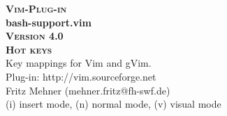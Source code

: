 \documentclass[oneside,11pt,landscape,DIV16]{scrartcl}
\newcommand{\Pluginversion}{4.0}
\begin{document}
%

\begin{multicols}{3}
%
\begin{center}
%
\textbf{\textsc{\small{Vim-Plug-in}}}\\
\textbf{\LARGE{bash-support.vim}}\\
\textbf{\textsc{\small{Version \Pluginversion}}}\\
\vspace{5mm}%
\textbf{\textsc{\Huge{Hot keys}}}\\ 
\vspace{5mm}%
Key mappings for Vim and gVim.\\
Plug-in: http://vim.sourceforge.net\\
Fritz Mehner (mehner.fritz@fh-swf.de)\\
\vspace{1.0mm}
{\normalsize (i)} insert mode, {\normalsize (n)} normal mode, {\normalsize (v)} visual mode\\
\vspace{4.0mm}


\end{center}
\end{multicols}
\end{document}
